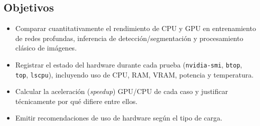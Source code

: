 \subsection*{Objetivos}
\begin{itemize}
  \item Comparar cuantitativamente el rendimiento de CPU y GPU en
        entrenamiento de redes profundas, inferencia de detección/segmentación
        y procesamiento clásico de imágenes.
  \item Registrar el estado del hardware durante cada prueba
        (\texttt{nvidia-smi}, \texttt{btop}, \texttt{top}, \texttt{lscpu}),
        incluyendo uso de CPU, RAM, VRAM, potencia y temperatura.
  \item Calcular la aceleración (\emph{speedup}) GPU/CPU de cada caso y
        justificar técnicamente por qué difiere entre ellos.
  \item Emitir recomendaciones de uso de hardware según el tipo de carga.
\end{itemize}
